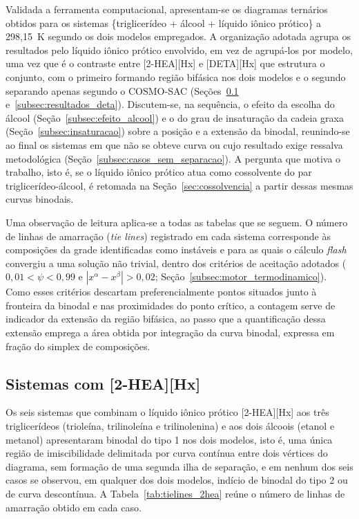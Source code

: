 Validada a ferramenta computacional, apresentam-se os diagramas ternários obtidos para os sistemas \{triglicerídeo + álcool + líquido iônico prótico\} a 298,15~K segundo os dois modelos empregados. A organização adotada agrupa os resultados pelo líquido iônico prótico envolvido, em vez de agrupá-los por modelo, uma vez que é o contraste entre [2-HEA][Hx] e [DETA][Hx] que estrutura o conjunto, com o primeiro formando região bifásica nos dois modelos e o segundo separando apenas segundo o COSMO-SAC (Seções~\ref{subsec:resultados_2hea} e~\ref{subsec:resultados_deta}). Discutem-se, na sequência, o efeito da escolha do álcool (Seção~\ref{subsec:efeito_alcool}) e o do grau de insaturação da cadeia graxa (Seção~\ref{subsec:insaturacao}) sobre a posição e a extensão da binodal, reunindo-se ao final os sistemas em que não se obteve curva ou cujo resultado exige ressalva metodológica (Seção~\ref{subsec:casos_sem_separacao}). A pergunta que motiva o trabalho, isto é, se o líquido iônico prótico atua como cossolvente do par triglicerídeo-álcool, é retomada na Seção~\ref{sec:cossolvencia} a partir dessas mesmas curvas binodais.

Uma observação de leitura aplica-se a todas as tabelas que se seguem. O número de linhas de amarração (\textit{tie lines}) registrado em cada sistema corresponde às composições da grade identificadas como instáveis e para as quais o cálculo \textit{flash} convergiu a uma solução não trivial, dentro dos critérios de aceitação adotados ($0{,}01 < \psi < 0{,}99$ e $|x^{\alpha} - x^{\beta}| > 0{,}02$; Seção~\ref{subsec:motor_termodinamico}). Como esses critérios descartam preferencialmente pontos situados junto à fronteira da binodal e nas proximidades do ponto crítico, a contagem serve de indicador da extensão da região bifásica, ao passo que a quantificação dessa extensão emprega a área obtida por integração da curva binodal, expressa em fração do simplex de composições.

\subsection{Sistemas com [2-HEA][Hx]}
\label{subsec:resultados_2hea}

Os seis sistemas que combinam o líquido iônico prótico [2-HEA][Hx] aos três triglicerídeos (trioleína, trilinoleína e trilinolenina) e aos dois álcoois (etanol e metanol) apresentaram binodal do tipo 1 nos dois modelos, isto é, uma única região de imiscibilidade delimitada por curva contínua entre dois vértices do diagrama, sem formação de uma segunda ilha de separação, e em nenhum dos seis casos se observou, em qualquer dos dois modelos, indício de binodal do tipo 2 ou de curva descontínua. A Tabela~\ref{tab:tielines_2hea} reúne o número de linhas de amarração obtido em cada caso.

